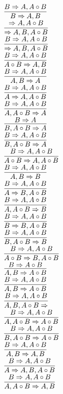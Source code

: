 \documentclass[11pt]{article}
\begin{document}
\begin{center}
\bigskip
\\$\infer{B\Rightarrow A, B}{B\Rightarrow A, A\circ B}$
\bigskip
\\$\infer{\Rightarrow A, B, A\circ B}{\Rightarrow A, A\circ B}$
\bigskip
\\$\infer{\Rightarrow A, B, A\circ B}{B\Rightarrow A, A\circ B}$
\bigskip
\\$\infer{A\circ B\Rightarrow A, B}{B\Rightarrow A, A\circ B}$
\bigskip
\\$\infer{A, B\Rightarrow A}{B\Rightarrow A, A\circ B}$
\bigskip
\\$\infer{A\Rightarrow A, A\circ B}{B\Rightarrow A, A\circ B}$
\bigskip
\\$\infer{A, A\circ B\Rightarrow A}{B\Rightarrow A, A\circ B}$
\bigskip
\\$\infer{B, A\circ B\Rightarrow A}{B\Rightarrow A}$
\bigskip
\\$\infer{B, A\circ B\Rightarrow A}{B\Rightarrow A, A\circ B}$
\bigskip
\\$\infer{A\circ B\Rightarrow A, A\circ B}{B\Rightarrow A, A\circ B}$
\bigskip
\\$\infer{A, B\Rightarrow B}{B\Rightarrow A, A\circ B}$
\bigskip
\\$\infer{A\Rightarrow B, A\circ B}{B\Rightarrow A, A\circ B}$
\bigskip
\\$\infer{A, A\circ B\Rightarrow B}{B\Rightarrow A, A\circ B}$
\bigskip
\\$\infer{B\Rightarrow B, A\circ B}{B\Rightarrow A, A\circ B}$
\bigskip
\\$\infer{B, A\circ B\Rightarrow B}{B\Rightarrow A, A\circ B}$
\bigskip
\\$\infer{A\circ B\Rightarrow B, A\circ B}{B\Rightarrow A, A\circ B}$
\bigskip
\\$\infer{A, B\Rightarrow A\circ B}{B\Rightarrow A\circ B}$
\bigskip
\\$\infer{A, B\Rightarrow A\circ B}{B\Rightarrow A, A\circ B}$
\bigskip
\\$\infer{A, B, A\circ B\Rightarrow }{B\Rightarrow A, A\circ B}$
\bigskip
\\$\infer{A, A\circ B\Rightarrow A\circ B}{B\Rightarrow A, A\circ B}$
\bigskip
\\$\infer{B, A\circ B\Rightarrow A\circ B}{B\Rightarrow A, A\circ B}$
\bigskip
\\$\infer{A, B\Rightarrow A, B}{B\Rightarrow A, A\circ B}$
\bigskip
\\$\infer{A\Rightarrow A, B, A\circ B}{B\Rightarrow A, A\circ B}$
\bigskip
\\$\infer{A, A\circ B\Rightarrow A, B}{B\Rightarrow A, A\circ B}$

\end{center}
\end{document}

